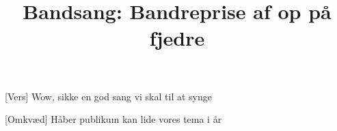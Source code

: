 \documentclass[a4paper,11pt]{article}
\title{Bandsang: Bandreprise af op på fjedre}
\begin{document}
\maketitle

\begin{song}
[Vers] Wow, sikke en god sang vi skal til at synge

[Omkvæd] Håber publikum kan lide vores tema i år
\end{song}
\end{document}
